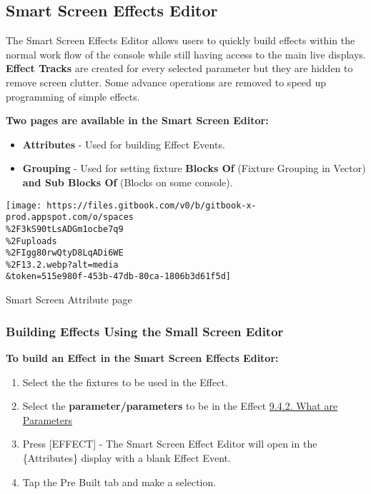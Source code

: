 \documentclass[
]{article}
\begin{document}
\hypertarget{smart-screen-effects-editor}{%
\subsection{Smart Screen Effects Editor}\label{smart-screen-effects-editor}}

The Smart Screen Effects Editor allows users to quickly build effects within the normal work flow of the console while still having access to the main live displays. \textbf{Effect Tracks} are created for every selected parameter but they are hidden to remove screen clutter. Some advance operations are removed to speed up programming of simple effects.

\textbf{Two pages are available in the Smart Screen Editor:}

\begin{itemize}
\item
  \textbf{Attributes} - Used for building Effect Events.
\item
  \textbf{Grouping} - Used for setting fixture \textbf{Blocks Of} (Fixture Grouping in Vector) \textbf{and Sub Blocks Of} (Blocks on some console).
\end{itemize}

\texttt{[image: https://files.gitbook.com/v0/b/gitbook-x-prod.appspot.com/o/spaces\\\%2F3kS90tLsADGm1ocbe7q9\\\%2Fuploads\\\%2FIgg80rwQtyD8LqADi6WE\\\%2F13.2.webp?alt=media\\\&token=515e980f-453b-47db-80ca-1806b3d61f5d]}

Smart Screen Attribute page

\hypertarget{building-effects-using-the-small-screen-editor}{%
\subsubsection{Building Effects Using the Small Screen Editor}\label{building-effects-using-the-small-screen-editor}}

\textbf{To build an Effect in the Smart Screen Effects Editor:}

\begin{enumerate}
\def\labelenumi{\arabic{enumi}.}
\item
  Select the the fixtures to be used in the Effect.
\item
  Select the \textbf{parameter/parameters} to be in the Effect \href{https://vibemanual.compulite.com/programming-basics.html\#what-are-parameters}{9.4.2. What are Parameters}
\item
  Press {[}EFFECT{]} - The Smart Screen Effect Editor will open in the \{Attributes\} display with a blank Effect Event.
\item
  {Tap the Pre Built tab and make a selection. }
\end{enumerate}
\end{document}
